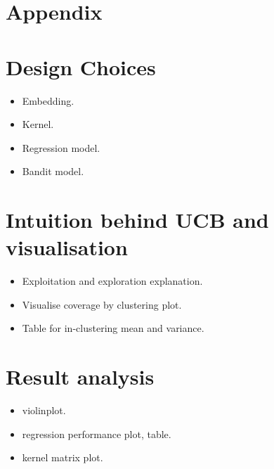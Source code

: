 \section*{Appendix}

\section{Design Choices}

\begin{itemize}
    \item Embedding.
    \item Kernel.
    \item Regression model.
    \item Bandit model.
\end{itemize}

\section{Intuition behind UCB and visualisation}

\begin{itemize}
    \item Exploitation and exploration explanation.
    \item Visualise coverage by clustering plot.
    \item Table for in-clustering mean and variance.
\end{itemize}

\section{Result analysis}

\begin{itemize}
    \item violinplot.
    \item regression performance plot, table.
    \item kernel matrix plot.
\end{itemize}

